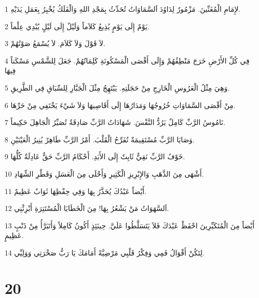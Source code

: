 \par 1 لإِمَامِ الْمُغَنِّينَ. مَزْمُورٌ لِدَاوُدَ اَلسَّمَاوَاتُ تُحَدِّثُ بِمَجْدِ اللهِ وَالْفَلَكُ يُخْبِرُ بِعَمَلِ يَدَيْهِ.
\par 2 يَوْمٌ إِلَى يَوْمٍ يُذِيعُ كَلاَماً وَلَيْلٌ إِلَى لَيْلٍ يُبْدِي عِلْماً.
\par 3 لاَ قَوْلَ وَلاَ كَلاَمَ. لاَ يُسْمَعُ صَوْتُهُمْ.
\par 4 فِي كُلِّ الأَرْضِ خَرَجَ مَنْطِقُهُمْ وَإِلَى أَقْصَى الْمَسْكُونَةِ كَلِمَاتُهُمْ. جَعَلَ لِلشَّمْسِ مَسْكَناً فِيهَا
\par 5 وَهِيَ مِثْلُ الْعَرُوسِ الْخَارِجِ مِنْ حَجَلَتِهِ. يَبْتَهِجُ مِثْلَ الْجَبَّارِ لِلسِّبَاقِ فِي الطَّرِيقِ.
\par 6 مِنْ أَقْصَى السَّمَاوَاتِ خُرُوجُهَا وَمَدَارُهَا إِلَى أَقَاصِيهَا وَلاَ شَيْءَ يَخْتَفِي مِنْ حَرِّهَا.
\par 7 نَامُوسُ الرَّبِّ كَامِلٌ يَرُدُّ النَّفْسَ. شَهَادَاتُ الرَّبِّ صَادِقَةٌ تُصَيِّرُ الْجَاهِلَ حَكِيماً.
\par 8 وَصَايَا الرَّبِّ مُسْتَقِيمَةٌ تُفَرِّحُ الْقَلْبَ. أَمْرُ الرَّبِّ طَاهِرٌ يُنِيرُ الْعَيْنَيْنِ.
\par 9 خَوْفُ الرَّبِّ نَقِيٌّ ثَابِتٌ إِلَى الأَبَدِ. أَحْكَامُ الرَّبِّ حَقٌّ عَادِلَةٌ كُلُّهَا.
\par 10 أَشْهَى مِنَ الذَّهَبِ وَالإِبْرِيزِ الْكَثِيرِ وَأَحْلَى مِنَ الْعَسَلِ وَقَطْرِ الشِّهَادِ.
\par 11 أَيْضاً عَبْدُكَ يُحَذَّرُ بِهَا وَفِي حِفْظِهَا ثَوَابٌ عَظِيمٌ.
\par 12 اَلسَّهَوَاتُ مَنْ يَشْعُرُ بِهَا! مِنَ الْخَطَايَا الْمُسْتَتِرَةِ أَبْرِئْنِي.
\par 13 أَيْضاً مِنَ الْمُتَكَبِّرِينَ احْفَظْ عَبْدَكَ فَلاَ يَتَسَلَّطُوا عَلَيَّ. حِينَئِذٍ أَكُونُ كَامِلاً وَأَتَبَرَّأُ مِنْ ذَنْبٍ عَظِيمٍ.
\par 14 لِتَكُنْ أَقْوَالُ فَمِي وَفِكْرُ قَلْبِي مَرْضِيَّةً أَمَامَكَ يَا رَبُّ صَخْرَتِي وَوَلِيِّي.

\chapter{20}

